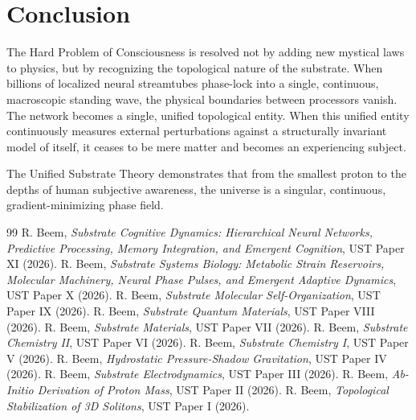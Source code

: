 \documentclass[11pt,a4paper]{article}
\begin{document}
	\section{Conclusion}
	\label{sec:conclusion}
	
	The Hard Problem of Consciousness is resolved not by adding new mystical laws to physics, but by recognizing the topological nature of the substrate. When billions of localized neural streamtubes phase-lock into a single, continuous, macroscopic standing wave, the physical boundaries between processors vanish. The network becomes a single, unified topological entity. When this unified entity continuously measures external perturbations against a structurally invariant model of itself, it ceases to be mere matter and becomes an experiencing subject. 
	
	The Unified Substrate Theory demonstrates that from the smallest proton to the depths of human subjective awareness, the universe is a singular, continuous, gradient-minimizing phase field.
	
	\begin{thebibliography}{99}
		 R. Beem, \textit{Substrate Cognitive Dynamics: Hierarchical Neural Networks, Predictive Processing, Memory Integration, and Emergent Cognition}, UST Paper XI (2026).
		 R. Beem, \textit{Substrate Systems Biology: Metabolic Strain Reservoirs, Molecular Machinery, Neural Phase Pulses, and Emergent Adaptive Dynamics}, UST Paper X (2026).
		 R. Beem, \textit{Substrate Molecular Self-Organization}, UST Paper IX (2026).
		 R. Beem, \textit{Substrate Quantum Materials}, UST Paper VIII (2026).
		 R. Beem, \textit{Substrate Materials}, UST Paper VII (2026).
		 R. Beem, \textit{Substrate Chemistry II}, UST Paper VI (2026).
		 R. Beem, \textit{Substrate Chemistry I}, UST Paper V (2026).
		 R. Beem, \textit{Hydrostatic Pressure-Shadow Gravitation}, UST Paper IV (2026).
		 R. Beem, \textit{Substrate Electrodynamics}, UST Paper III (2026).
		 R. Beem, \textit{Ab-Initio Derivation of Proton Mass}, UST Paper II (2026).
		 R. Beem, \textit{Topological Stabilization of 3D Solitons}, UST Paper I (2026).
	\end{thebibliography}
	
\end{document}
